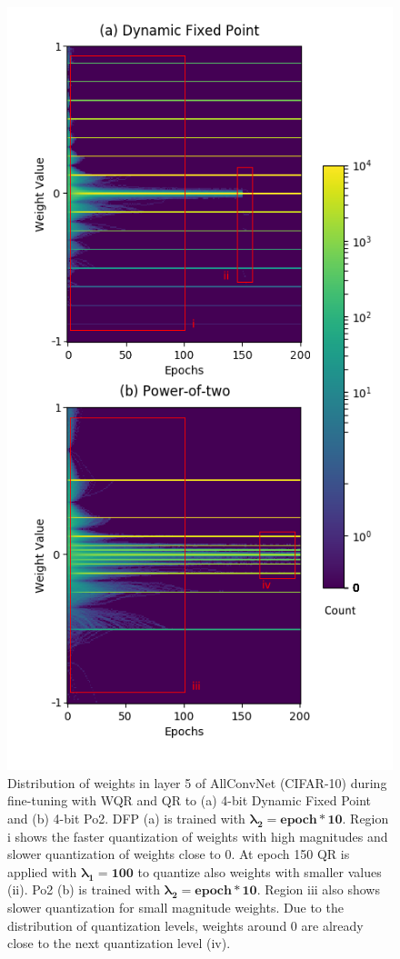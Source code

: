 \begin{figure}[ht!]
\includegraphics[width=\columnwidth]{img/histotime2.png}
\caption{Distribution of weights in layer 5 of AllConvNet (CIFAR-10) during fine-tuning with WQR and QR to (a) 4-bit Dynamic Fixed Point and (b) 4-bit Po2. DFP (a) is trained with $\mathbf{\lambda_2 = epoch*10}$. Region i shows the faster quantization of weights with high magnitudes and slower quantization of weights close to 0. At epoch 150 QR is applied with $\mathbf{\lambda_1 = 100}$ to quantize also weights with smaller values (ii). Po2 (b) is trained with $\mathbf{\lambda_2 = epoch*10}$. Region iii also shows slower quantization for small magnitude weights. Due to the distribution of quantization levels, weights around 0 are already close to the next quantization level (iv).}
\label{fig:WQR_QR}
\end{figure}


